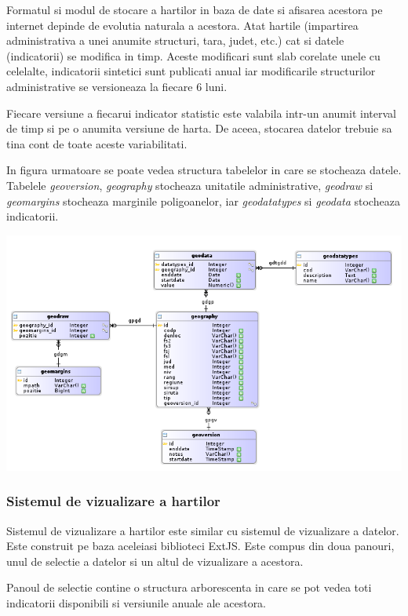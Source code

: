 \documentclass[a4paper, 10pt]{article}
\begin{document}
{Formatul si modul de stocare a hartilor in baza de date si afisarea acestora pe internet depinde de evolutia naturala a acestora. Atat hartile (impartirea administrativa a unei anumite structuri, tara, judet, etc.) cat si datele (indicatorii) se modifica in timp. 
Aceste modificari sunt slab corelate unele cu celelalte, indicatorii sintetici sunt publicati anual iar modificarile structurilor administrative se versioneaza la fiecare 6 luni. 

Fiecare versiune a fiecarui indicator statistic este valabila intr-un anumit interval de timp si pe o anumita versiune de harta. De aceea, stocarea datelor trebuie sa tina cont de toate aceste variabilitati. 

In figura urmatoare se poate vedea structura tabelelor in care se stocheaza datele. 
Tabelele \emph{geoversion}, \emph{geography} stocheaza unitatile administrative, 
\emph{geodraw} si \emph{geomargins} stocheaza marginile poligoanelor, 
iar \emph{geodatatypes} si \emph{geodata} stocheaza indicatorii. 

\includegraphics[width=\textwidth]{img/geo-database}

\subsubsection{Sistemul de vizualizare a hartilor}

Sistemul de vizualizare a hartilor este similar cu sistemul de vizualizare a datelor. Este construit pe baza aceleiasi biblioteci ExtJS. Este compus din doua panouri, unul de selectie a datelor si un altul de vizualizare a acestora. 

Panoul de selectie contine o structura arborescenta in care se pot vedea toti indicatorii disponibili si versiunile anuale ale acestora. 

}
\end{document}
